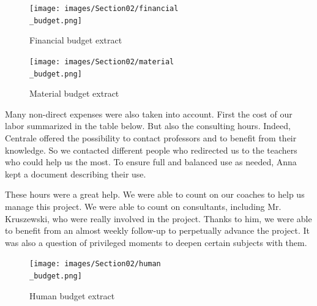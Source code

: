 \begin{figure}[ht]
    \centering
    \texttt{[image: images/Section02/financial\\\_budget.png]}
    \caption{Financial budget extract}
    \label{fig:mesh7}
\end{figure}

\begin{figure}[ht]
    \centering
    \texttt{[image: images/Section02/material\\\_budget.png]}
    \caption{Material budget extract}
    \label{fig:mesh8}
\end{figure}

Many non-direct expenses were also taken into account. First the cost of our labor summarized in the table below. But also the consulting hours. Indeed, Centrale offered the possibility to contact professors and to benefit from their knowledge. So we contacted different people who redirected us to the teachers who could help us the most. To ensure full and balanced use as needed, Anna kept a document describing their use. 

\bigbreak
These hours were a great help. We were able to count on our coaches to help us manage this project. We were able to count on consultants, including Mr. Kruszewski, who were really involved in the project. Thanks to him, we were able to benefit from an almost weekly follow-up to perpetually advance the project. It was also a question of privileged moments to deepen certain subjects with them.

\begin{figure}[ht]
    \centering
    \texttt{[image: images/Section02/human\\\_budget.png]}
    \caption{Human budget extract}
    \label{fig:mesh9}
\end{figure}